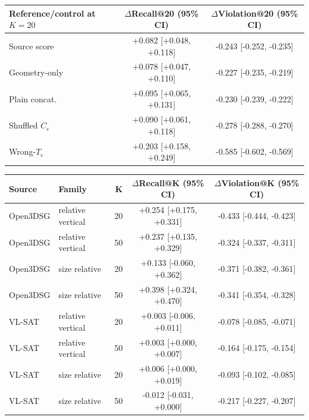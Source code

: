 \vspace{8pt}
\begin{center}
\centering
\small
\setlength{\tabcolsep}{5pt}
\begin{tabular}{lcc}
\toprule
Reference/control at $K=20$ & $\Delta$Recall@20 (95\% CI) & $\Delta$Violation@20 (95\% CI) \\
\midrule
Source score & +0.082 [+0.048, +0.118] & -0.243 [-0.252, -0.235] \\
Geometry-only & +0.078 [+0.047, +0.110] & -0.227 [-0.235, -0.219] \\
Plain concat. & +0.095 [+0.065, +0.131] & -0.230 [-0.239, -0.222] \\
Shuffled $C_e$ & +0.090 [+0.061, +0.118] & -0.278 [-0.288, -0.270] \\
Wrong-$T_e$ & +0.203 [+0.158, +0.249] & -0.585 [-0.602, -0.569] \\
\bottomrule
\end{tabular}
\label{tab:supp-controls}
\end{center}

\vspace{5pt}
\begin{center}
\centering
\scriptsize
\setlength{\tabcolsep}{3.5pt}
\begin{tabular}{llrcc}
\toprule
Source & Family & K & $\Delta$Recall@K (95\% CI) & $\Delta$Violation@K (95\% CI) \\
\midrule
Open3DSG & relative vertical & 20 & +0.254 [+0.175, +0.331] & -0.433 [-0.444, -0.423] \\
Open3DSG & relative vertical & 50 & +0.237 [+0.135, +0.329] & -0.324 [-0.337, -0.311] \\
Open3DSG & size relative & 20 & +0.133 [-0.060, +0.362] & -0.371 [-0.382, -0.361] \\
Open3DSG & size relative & 50 & +0.398 [+0.324, +0.470] & -0.341 [-0.354, -0.328] \\
VL-SAT & relative vertical & 20 & +0.003 [-0.006, +0.011] & -0.078 [-0.085, -0.071] \\
VL-SAT & relative vertical & 50 & +0.003 [+0.000, +0.007] & -0.164 [-0.175, -0.154] \\
VL-SAT & size relative & 20 & +0.006 [+0.000, +0.019] & -0.093 [-0.102, -0.085] \\
VL-SAT & size relative & 50 & -0.012 [-0.031, +0.000] & -0.217 [-0.227, -0.207] \\
\bottomrule
\end{tabular}
\label{tab:supp-family-ci}
\end{center}

